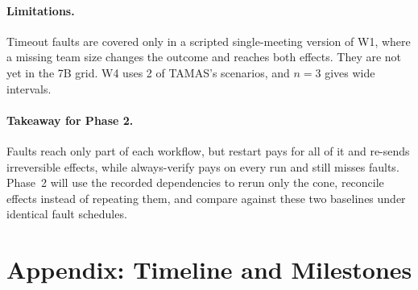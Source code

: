 \documentclass[10pt,twocolumn,letterpaper]{article}
\begin{document}
\paragraph{Limitations.} Timeout faults are covered only in a scripted
single-meeting version of W1, where a missing team size changes the outcome and
reaches both effects. They are not yet in the 7B grid. W4 uses 2 of TAMAS's
scenarios, and $n{=}3$ gives wide intervals.

\paragraph{Takeaway for Phase 2.} Faults reach only part of each workflow, but
restart pays for all of it and re-sends irreversible effects, while
always-verify pays on every run and still misses faults. Phase~2 will use the
recorded dependencies to rerun only the cone, reconcile effects instead of
repeating them, and compare against these two baselines under identical fault
schedules.

{\footnotesize


}

\clearpage
\onecolumn
\appendix
\section*{Appendix: Timeline and Milestones}
\end{document}
